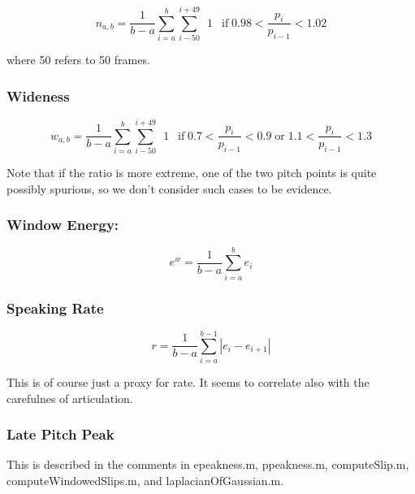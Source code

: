 \documentclass[11pt]{article}
\begin{document}
\begin{equation}
n_{a,b} = \frac{1}{b-a} \sum\limits_{i=a}^b \sum\limits_{i-50}^{i+49} \enspace 1 \enspace \operatorname{if} 0.98 <  \frac{p_i}{p_{i-1}} < 1.02 
\end{equation}

where 50 refers to 50 frames.


\subsubsection{Wideness}

\begin{equation}
w_{a,b} = \frac{1}{b-a} \sum\limits_{i=a}^b \sum\limits_{i-50}^{i+49} \enspace 1 \enspace \operatorname{if} 0.7 <  \frac{p_i}{p_{i-1}} < 0.9 \operatorname{or} 1.1 <  \frac{p_i}{p_{i-1}} < 1.3
\end{equation}

Note that if the ratio is more extreme, one of the two pitch points is
quite possibly spurious, so we don't consider such cases to be evidence. 


\bigskip
\subsubsection{Window Energy:}

\begin{equation}
e^w = \frac{1}{b - a} \sum\limits_{i=a}^{b}e_i
\end{equation}

\subsubsection{Speaking Rate}
\begin{equation}
r = \frac{1}{b - a} \sum\limits_{i=a}^{b-1}|e_i - e_{i+1}|
\end{equation}

This is of course just a proxy for rate.  It seems to correlate also
with the carefulnes of articulation.

\subsubsection{Late Pitch Peak}

This is described in the comments in epeakness.m, ppeakness.m,
computeSlip.m, computeWindowedSlips.m, and laplacianOfGaussian.m. 
\end{document}
